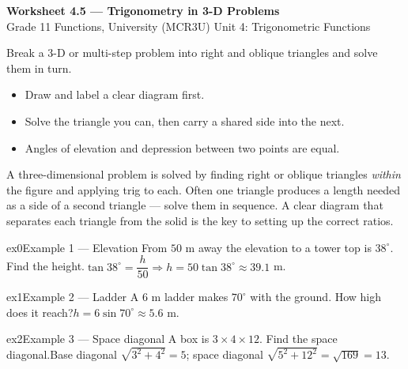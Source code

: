 \documentclass[11pt]{article}
\begin{document}
\begin{center}
{\LARGE\bfseries\color{titleblue}Worksheet 4.5 --- Trigonometry in 3-D Problems}\\[2pt]
{\small Grade 11 Functions, University (MCR3U) \textperiodcentered{} Unit 4: Trigonometric Functions}
\end{center}

\begin{ideabox}
Break a 3-D or multi-step problem into right and oblique triangles and solve them in turn.
\begin{itemize}[leftmargin=*,itemsep=2pt]
  \item Draw and label a clear diagram first.
  \item Solve the triangle you can, then carry a shared side into the next.
  \item Angles of elevation and depression between two points are equal.
\end{itemize}
\end{ideabox}

\begin{learnbox}
A three-dimensional problem is solved by finding right or oblique triangles \emph{within} the figure and applying trig to each.
Often one triangle produces a length needed as a side of a second triangle — solve them in sequence.
A clear diagram that separates each triangle from the solid is the key to setting up the correct ratios.
\end{learnbox}


\begin{example}{ex0}{Example 1 --- Elevation}
From $50$ m away the elevation to a tower top is $38^\circ$. Find the height.\soln $\tan38^\circ=\dfrac{h}{50}\Rightarrow h=50\tan38^\circ\approx39.1$ m.
\end{example}

\begin{example}{ex1}{Example 2 --- Ladder}
A $6$ m ladder makes $70^\circ$ with the ground. How high does it reach?\soln $h=6\sin70^\circ\approx5.6$ m.
\end{example}

\begin{example}{ex2}{Example 3 --- Space diagonal}
A box is $3\times4\times12$. Find the space diagonal.\soln Base diagonal $\sqrt{3^2+4^2}=5$; space diagonal $\sqrt{5^2+12^2}=\sqrt{169}=13$.
\end{example}
\end{document}
